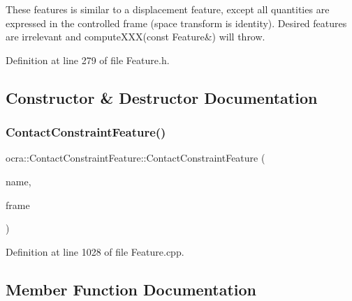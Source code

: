 These features is similar to a displacement feature, except all quantities are expressed in the controlled frame (space transform is identity). Desired features are irrelevant and compute\+X\+X\+X(const Feature\&) will throw. 

Definition at line 279 of file Feature.\+h.



\subsection{Constructor \& Destructor Documentation}
\hypertarget{classocra_1_1ContactConstraintFeature_a2e4c6265bd194309b5e2304260d53bec}{}\label{classocra_1_1ContactConstraintFeature_a2e4c6265bd194309b5e2304260d53bec} 
\subsubsection{\texorpdfstring{Contact\+Constraint\+Feature()}{ContactConstraintFeature()}}
{\footnotesize\ttfamily ocra\+::\+Contact\+Constraint\+Feature\+::\+Contact\+Constraint\+Feature (\begin{DoxyParamCaption}\item[{const std\+::string \&}]{name,  }\item[{Control\+Frame\+::\+Ptr}]{frame }\end{DoxyParamCaption})}



Definition at line 1028 of file Feature.\+cpp.



\subsection{Member Function Documentation}
\hypertarget{classocra_1_1ContactConstraintFeature_a81aeb9d50b198c49d0868ba8321bcfd7}{}\label{classocra_1_1ContactConstraintFeature_a81aeb9d50b198c49d0868ba8321bcfd7} 
